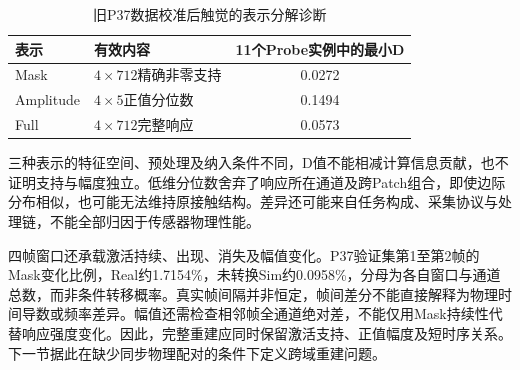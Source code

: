 \begin{table}[htbp]
 \centering\small
 \caption{旧P37数据校准后触觉的表示分解诊断}
 \label{tab:ch05_domain_feature_difference}
 \begin{tabular}{llc}
 \hline
 表示&有效内容&11个Probe实例中的最小D\\\hline
 Mask&$4\times712$精确非零支持&0.0272\\
 Amplitude&$4\times5$正值分位数&0.1494\\
 Full&$4\times712$完整响应&0.0573\\\hline
 \end{tabular}
\end{table}

三种表示的特征空间、预处理及纳入条件不同，D值不能相减计算信息贡献，也不证明支持与幅度独立。低维分位数舍弃了响应所在通道及跨Patch组合，即使边际分布相似，也可能无法维持原接触结构。差异还可能来自任务构成、采集协议与处理链，不能全部归因于传感器物理性能。

四帧窗口还承载激活持续、出现、消失及幅值变化。P37验证集第1至第2帧的Mask变化比例，Real约1.7154\%，未转换Sim约0.0958\%，分母为各自窗口与通道总数，而非条件转移概率。真实帧间隔并非恒定，帧间差分不能直接解释为物理时间导数或频率差异。幅值还需检查相邻帧全通道绝对差，不能仅用Mask持续性代替响应强度变化。因此，完整重建应同时保留激活支持、正值幅度及短时序关系。下一节据此在缺少同步物理配对的条件下定义跨域重建问题。
